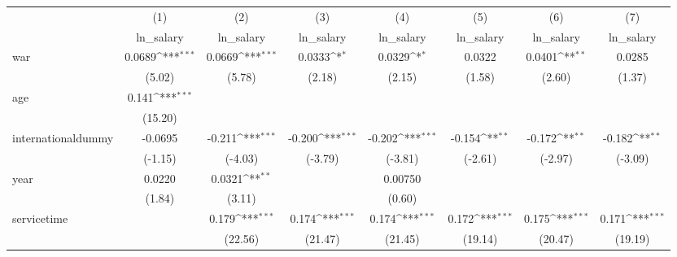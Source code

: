 {
\def\sym#1{\ifmmode^{#1}\else\(^{#1}\)\fi}
\begin{tabular}{l*{7}{c}}
\hline\hline
            &\multicolumn{1}{c}{(1)}&\multicolumn{1}{c}{(2)}&\multicolumn{1}{c}{(3)}&\multicolumn{1}{c}{(4)}&\multicolumn{1}{c}{(5)}&\multicolumn{1}{c}{(6)}&\multicolumn{1}{c}{(7)}\\
            &\multicolumn{1}{c}{ln\_salary}&\multicolumn{1}{c}{ln\_salary}&\multicolumn{1}{c}{ln\_salary}&\multicolumn{1}{c}{ln\_salary}&\multicolumn{1}{c}{ln\_salary}&\multicolumn{1}{c}{ln\_salary}&\multicolumn{1}{c}{ln\_salary}\\
\hline
war         &      0.0689\sym{***}&      0.0669\sym{***}&      0.0333\sym{*}  &      0.0329\sym{*}  &      0.0322         &      0.0401\sym{**} &      0.0285         \\
            &      (5.02)         &      (5.78)         &      (2.18)         &      (2.15)         &      (1.58)         &      (2.60)         &      (1.37)         \\
[1em]
age         &       0.141\sym{***}&                     &                     &                     &                     &                     &                     \\
            &     (15.20)         &                     &                     &                     &                     &                     &                     \\
[1em]
internationaldummy&     -0.0695         &      -0.211\sym{***}&      -0.200\sym{***}&      -0.202\sym{***}&      -0.154\sym{**} &      -0.172\sym{**} &      -0.182\sym{**} \\
            &     (-1.15)         &     (-4.03)         &     (-3.79)         &     (-3.81)         &     (-2.61)         &     (-2.97)         &     (-3.09)         \\
[1em]
year        &      0.0220         &      0.0321\sym{**} &                     &     0.00750         &                     &                     &                     \\
            &      (1.84)         &      (3.11)         &                     &      (0.60)         &                     &                     &                     \\
[1em]
servicetime &                     &       0.179\sym{***}&       0.174\sym{***}&       0.174\sym{***}&       0.172\sym{***}&       0.175\sym{***}&       0.171\sym{***}\\
            &                     &     (22.56)         &     (21.47)         &     (21.45)         &     (19.14)         &     (20.47)         &     (19.19)         \\

\end{tabular}}
